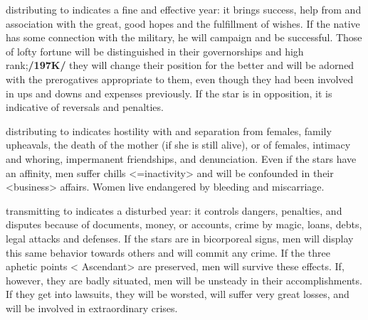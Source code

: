 \Mars\xspace distributing to \Jupiter\xspace indicates a fine and effective year: it brings success, help from and association with the great, good hopes and the fulfillment of wishes. If the native has some connection with the military, he will campaign and be successful. Those of lofty fortune will be distinguished in their governorships and high rank;\textbf{/197K/} they will change their position for the better and will be adorned with the prerogatives appropriate to them, even though they had been involved in ups and downs and expenses
previously. If the star is in opposition, it is indicative of reversals and penalties.

\Mars\xspace distributing to \Venus\xspace indicates hostility with and separation from females, family upheavals, the death of the mother (if she is still alive), or of females, intimacy and whoring, impermanent friendships, and denunciation. Even if the stars have an affinity, men suffer chills <=inactivity> and will be confounded in their <business> affairs. Women live endangered by bleeding and miscarriage.

\Mars\xspace transmitting to \Mercury\xspace indicates a disturbed year: it controls dangers, penalties, and disputes
because of documents, money, or accounts, crime by magic, loans, debts, legal attacks and defenses. If the stars are in bicorporeal signs, men will display this same behavior towards others and will commit any crime. If the three aphetic points <\Sun\xspace \Moon\xspace Ascendant> are preserved, men will survive these effects. If, however, they are badly situated, men will be unsteady in their accomplishments. If they get into lawsuits, they will be worsted, will suffer very great losses, and will be involved in extraordinary crises.

\newpage